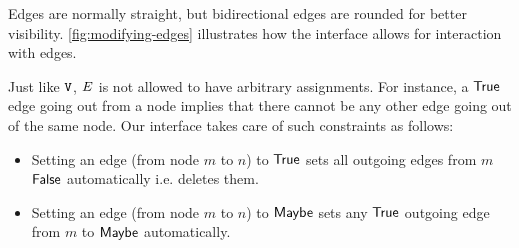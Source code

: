 Edges are normally straight, but bidirectional edges are rounded for better visibility.
\autoref{fig:modifying-edges} illustrates how the interface allows for interaction with
edges.

Just like $\mathtt{V}$, $E$ is not allowed to have arbitrary assignments. For
instance, a $\mathsf{True}$ edge going out from a node implies that there cannot be any other
edge going out of the same node. Our interface takes care of such constraints as follows:

\begin{itemize}
  \item Setting an edge (from node $m$ to $n$) to $\mathsf{True}$ sets all outgoing edges from $m$ $\mathsf{False}$ automatically i.e. deletes them.
  \item Setting an edge (from node $m$ to $n$) to $\mathsf{Maybe}$ sets any $\mathsf{True}$ outgoing edge from $m$ to $\mathsf{Maybe}$ automatically.
\end{itemize}

